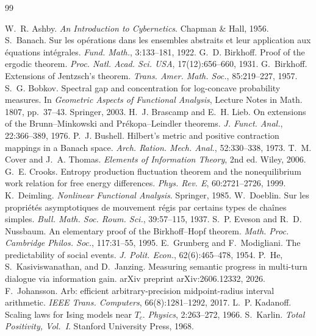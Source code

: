 \documentclass[11pt]{article}
\theoremstyle{plain}
\theoremstyle{definition}
\theoremstyle{remark}
\begin{document}
\begin{thebibliography}{99}

 W.~R. Ashby. \emph{An Introduction to Cybernetics}. Chapman \& Hall, 1956.
 S.~Banach. Sur les op\'erations dans les ensembles abstraits et leur application aux \'equations int\'egrales. \emph{Fund. Math.}, 3:133--181, 1922.
 G.~D. Birkhoff. Proof of the ergodic theorem. \emph{Proc. Natl. Acad. Sci. USA}, 17(12):656--660, 1931.
 G.~Birkhoff. Extensions of Jentzsch's theorem. \emph{Trans. Amer. Math. Soc.}, 85:219--227, 1957.
 S.~G. Bobkov. Spectral gap and concentration for log-concave probability measures. In \emph{Geometric Aspects of Functional Analysis}, Lecture Notes in Math. 1807, pp.~37--43. Springer, 2003.
 H.~J. Brascamp and E.~H. Lieb. On extensions of the Brunn--Minkowski and Pr\'ekopa--Leindler theorems. \emph{J. Funct. Anal.}, 22:366--389, 1976.
 P.~J. Bushell. Hilbert's metric and positive contraction mappings in a Banach space. \emph{Arch. Ration. Mech. Anal.}, 52:330--338, 1973.
 T.~M. Cover and J.~A. Thomas. \emph{Elements of Information Theory}, 2nd ed. Wiley, 2006.
 G.~E. Crooks. Entropy production fluctuation theorem and the nonequilibrium work relation for free energy differences. \emph{Phys. Rev. E}, 60:2721--2726, 1999.
 K.~Deimling. \emph{Nonlinear Functional Analysis}. Springer, 1985.
 W.~Doeblin. Sur les propri\'et\'es asymptotiques de mouvement r\'egis par certains types de cha\^ines simples. \emph{Bull. Math. Soc. Roum. Sci.}, 39:57--115, 1937.
 S.~P. Eveson and R.~D. Nussbaum. An elementary proof of the Birkhoff--Hopf theorem. \emph{Math. Proc. Cambridge Philos. Soc.}, 117:31--55, 1995.
 E.~Grunberg and F.~Modigliani. The predictability of social events. \emph{J. Polit. Econ.}, 62(6):465--478, 1954.
 P.~He, S.~Kasiviswanathan, and D.~Janzing. Measuring semantic progress in multi-turn dialogue via information gain. arXiv preprint arXiv:2606.12332, 2026.
 F.~Johansson. Arb: efficient arbitrary-precision midpoint-radius interval arithmetic. \emph{IEEE Trans. Computers}, 66(8):1281--1292, 2017.
 L.~P. Kadanoff. Scaling laws for Ising models near $T_c$. \emph{Physics}, 2:263--272, 1966.
 S.~Karlin. \emph{Total Positivity, Vol.~I}. Stanford University Press, 1968.

\end{thebibliography}
\end{document}
